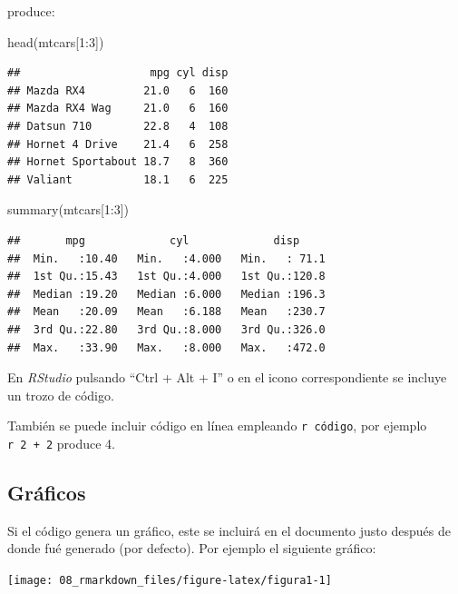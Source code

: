 \documentclass[
]{book}
\newenvironment{Shaded}{\begin{snugshade}}{\end{snugshade}}
\newcommand{\DecValTok}[1]{\textcolor[rgb]{0.00,0.00,0.81}{#1}}
\newcommand{\FunctionTok}[1]{\textcolor[rgb]{0.00,0.00,0.00}{#1}}
\newcommand{\NormalTok}[1]{#1}
\newcommand{\SpecialCharTok}[1]{\textcolor[rgb]{0.00,0.00,0.00}{#1}}
\theoremstyle{break}
\theoremstyle{nonumberplain}
\begin{document}
produce:

\begin{Shaded}
\begin{Highlighting}[]
\FunctionTok{head}\NormalTok{(mtcars[}\DecValTok{1}\SpecialCharTok{:}\DecValTok{3}\NormalTok{])}
\end{Highlighting}
\end{Shaded}

\begin{verbatim}
##                    mpg cyl disp
## Mazda RX4         21.0   6  160
## Mazda RX4 Wag     21.0   6  160
## Datsun 710        22.8   4  108
## Hornet 4 Drive    21.4   6  258
## Hornet Sportabout 18.7   8  360
## Valiant           18.1   6  225
\end{verbatim}

\begin{Shaded}
\begin{Highlighting}[]
\FunctionTok{summary}\NormalTok{(mtcars[}\DecValTok{1}\SpecialCharTok{:}\DecValTok{3}\NormalTok{])}
\end{Highlighting}
\end{Shaded}

\begin{verbatim}
##       mpg             cyl             disp      
##  Min.   :10.40   Min.   :4.000   Min.   : 71.1  
##  1st Qu.:15.43   1st Qu.:4.000   1st Qu.:120.8  
##  Median :19.20   Median :6.000   Median :196.3  
##  Mean   :20.09   Mean   :6.188   Mean   :230.7  
##  3rd Qu.:22.80   3rd Qu.:8.000   3rd Qu.:326.0  
##  Max.   :33.90   Max.   :8.000   Max.   :472.0
\end{verbatim}

En \emph{RStudio} pulsando ``Ctrl + Alt + I'' o en el icono correspondiente se incluye un trozo de código.

También se puede incluir código en línea empleando \texttt{\textasciigrave{}r\ código\textasciigrave{}},
por ejemplo \texttt{\textasciigrave{}r\ 2\ +\ 2\textasciigrave{}} produce 4.

\hypertarget{gruxe1ficos}{%
\subsection{Gráficos}\label{gruxe1ficos}}

Si el código genera un gráfico, este se incluirá en el documento justo después de donde fué generado
(por defecto). Por ejemplo el siguiente gráfico:

\begin{center}\texttt{[image: 08\_rmarkdown\_files/figure-latex/figura1-1]} \end{center}
\end{document}
